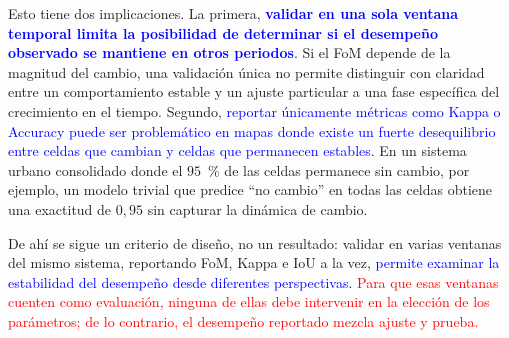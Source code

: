 Esto tiene dos implicaciones. La primera,
\textbf{\textcolor{blue}{validar en una sola ventana temporal limita la
posibilidad de determinar si el desempeño observado se mantiene en otros
periodos}}. Si el FoM depende de la magnitud del cambio, una validación única
no permite distinguir con claridad entre un comportamiento estable y un ajuste
particular a una fase específica del crecimiento en el tiempo. Segundo,
\textcolor{blue}{reportar únicamente métricas como Kappa o Accuracy puede ser
problemático en mapas donde existe un fuerte desequilibrio entre celdas que
cambian y celdas que permanecen estables}. En un sistema urbano consolidado
donde el $95$~\% de las celdas permanece sin cambio, por ejemplo, un modelo
trivial que predice ``no cambio'' en todas las celdas obtiene una exactitud de
$0{,}95$ sin capturar la dinámica de cambio.

De ahí se sigue un criterio de diseño, no un resultado: validar en varias
ventanas del mismo sistema, reportando FoM, Kappa e IoU a la vez, \textcolor{blue}{permite
examinar la estabilidad del desempeño desde diferentes perspectivas}.
\textcolor{red}{Para que esas ventanas cuenten como evaluación, ninguna de ellas
debe intervenir en la elección de los parámetros; de lo contrario, el desempeño
reportado mezcla ajuste y prueba.}


